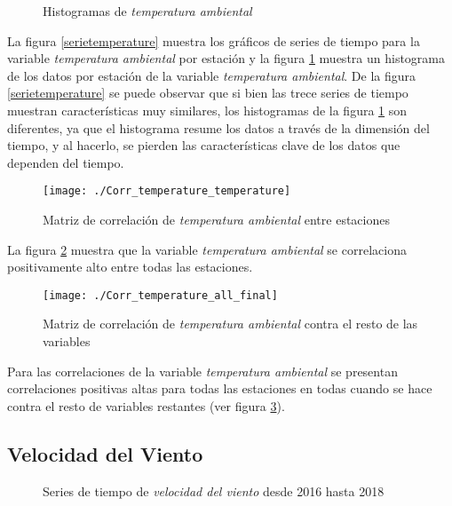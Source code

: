 \begin{figure}[H]
\centering
{}
\caption{Histogramas de {\em temperatura ambiental}}
\label{histtemperature}
\end{figure}

La figura \ref{serietemperature} muestra los gráficos de series de tiempo para la variable {\em temperatura ambiental} por estación y la figura \ref{histtemperature} muestra un histograma de los datos por estación de la variable {\em temperatura ambiental}. De la figura \ref{serietemperature} se puede observar que si bien las trece series de tiempo muestran características muy similares, los histogramas de la figura \ref{histtemperature} son diferentes, ya que el histograma resume los datos a través de la dimensión del tiempo, y al hacerlo, se pierden las características clave de los datos que dependen del tiempo.

\begin{figure}[H]
\centering
\texttt{[image: ./Corr\_temperature\_temperature]}
\caption{Matriz de correlación de {\em temperatura ambiental} entre estaciones }
\label{corrtemperature2}
\end{figure}

La figura \ref{corrtemperature2} muestra que la variable {\em temperatura ambiental} se correlaciona positivamente alto entre todas las estaciones.

\begin{figure}[H]
\centering
\texttt{[image: ./Corr\_temperature\_all\_final]}
\caption{Matriz de correlación de {\em temperatura ambiental} contra el resto de las variables}
\label{corrtemperature}
\end{figure}

Para las correlaciones de la variable {\em temperatura ambiental} se presentan correlaciones positivas altas para todas las estaciones en todas cuando se hace contra el resto de variables restantes (ver figura \ref{corrtemperature}). 





\subsection{Velocidad del Viento}
\begin{figure}[H]
\centering
{}
\caption{Series de tiempo de {\em velocidad del viento} desde 2016 hasta 2018}
\label{serievelocity}
\end{figure}

